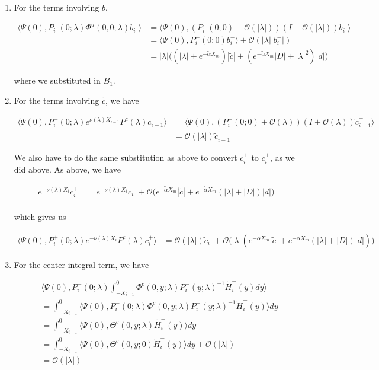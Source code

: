 \documentclass[12pt]{article}
\begin{document}
\begin{enumerate}
\item For the terms involving $b$,

\begin{align*}
\langle \Psi(0), P_i^-(0; \lambda) \Phi^u(0, 0; \lambda) b_i^- \rangle
&= \langle \Psi(0), (P_i^-(0; 0) + \mathcal{O}(|\lambda|))(I + \mathcal{O}(|\lambda|)) b_i^- \rangle \\
&= \langle \Psi(0), P_i^-(0; 0) b_i^- \rangle + \mathcal{O}(|\lambda||b_i^-|) \\
&= |\lambda| \Big(
(|\lambda| + e^{-\tilde{\alpha}X_m})|\tilde{c}|
+ (e^{-\tilde{\alpha}X_m}|D| 
+ |\lambda|^2)|d|
\Big)
\end{align*}

where we substituted in $B_1$.

\item For the terms involving $\tilde{c}$, we have

\begin{align*}
\langle \Psi(0), P_i^-(0; \lambda)e^{\nu(\lambda) X_{i-1}} P^c(\lambda) c_{i-1}^-\rangle &= 
\langle \Psi(0), (P_i^-(0; 0) + \mathcal{O}(\lambda))(I + \mathcal{O}(\lambda)) \tilde{c}_{i-1}^+ \rangle \\
&= \mathcal{O}(|\lambda|) \tilde{c}_{i-1}^+
\end{align*}

We also have to do the same substitution as above to convert $c_i^+$ to $c_i^+$, as we did above. As above, we have

\begin{align*}
e^{-\nu(\lambda)X_i} c_i^+ &= e^{-\nu(\lambda)X_i} c_i^- + \mathcal{O}\Big( e^{-\tilde{\alpha} X_m} |\tilde{c}| + e^{-\tilde{\alpha} X_m}(|\lambda| + |D| ) |d| \Big) \\
\end{align*}

which gives us

\begin{align*}
\langle \Psi(0), P_i^+(0; \lambda)e^{-\nu(\lambda) X_i} P^c(\lambda) c_i^+ \rangle 
&= \mathcal{O}(|\lambda|) \tilde{c}_i^- + \mathcal{O}\Big( |\lambda|( e^{-\tilde{\alpha} X_m} |\tilde{c}| + e^{-\tilde{\alpha} X_m}(|\lambda| + |D| ) |d| ) \Big)
\end{align*}

\item For the center integral term, we have

\begin{align*}
&\langle \Psi(0), P_i^-(0; \lambda)
\int_{-X_{i-1}}^0 \Phi^c(0, y; \lambda) P_i^-(y; \lambda)^{-1} \tilde{H}_i^-(y) dy \rangle \\
&= \int_{-X_{i-1}}^0 \langle \Psi(0), P_i^-(0; \lambda) \Phi^c(0, y; \lambda) P_i^-(y; \lambda)^{-1} \tilde{H}_i^-(y) \rangle dy \\
&= \int_{-X_{i-1}}^0 \langle \Psi(0), \Theta^c(0, y; \lambda) \tilde{H}_i^-(y) \rangle dy \\
&= \int_{-X_{i-1}}^0 \langle \Psi(0), \Theta^c(0, y; 0) \tilde{H}_i^-(y) \rangle dy + \mathcal{O}(|\lambda|) \\
&= \mathcal{O}(|\lambda|)
\end{align*}


\end{enumerate}
\end{document}
